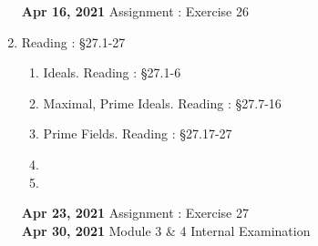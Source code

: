 \begin{enumerate}[label=Week \arabic*]
		\textbf{Apr 16, 2021} Assignment : Exercise 26
	\item Reading : \S27.1-27 
		\begin{enumerate}[label=Day \arabic*]
			\item Ideals. Reading : \S27.1-6
			\item Maximal, Prime Ideals. Reading : \S27.7-16
			\item Prime Fields. Reading : \S27.17-27
			\item
			\item
		\end{enumerate}
		\textbf{Apr 23, 2021} Assignment : Exercise 27\\
		\textbf{Apr 30, 2021} Module 3 \& 4 Internal Examination
\end{enumerate}
